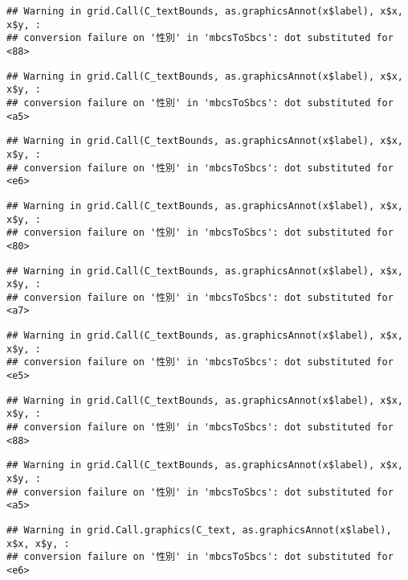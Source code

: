 \documentclass[
]{book}
\begin{document}
\begin{verbatim}
## Warning in grid.Call(C_textBounds, as.graphicsAnnot(x$label), x$x, x$y, :
## conversion failure on '性別' in 'mbcsToSbcs': dot substituted for <88>
\end{verbatim}

\begin{verbatim}
## Warning in grid.Call(C_textBounds, as.graphicsAnnot(x$label), x$x, x$y, :
## conversion failure on '性別' in 'mbcsToSbcs': dot substituted for <a5>
\end{verbatim}

\begin{verbatim}
## Warning in grid.Call(C_textBounds, as.graphicsAnnot(x$label), x$x, x$y, :
## conversion failure on '性別' in 'mbcsToSbcs': dot substituted for <e6>
\end{verbatim}

\begin{verbatim}
## Warning in grid.Call(C_textBounds, as.graphicsAnnot(x$label), x$x, x$y, :
## conversion failure on '性別' in 'mbcsToSbcs': dot substituted for <80>
\end{verbatim}

\begin{verbatim}
## Warning in grid.Call(C_textBounds, as.graphicsAnnot(x$label), x$x, x$y, :
## conversion failure on '性別' in 'mbcsToSbcs': dot substituted for <a7>
\end{verbatim}

\begin{verbatim}
## Warning in grid.Call(C_textBounds, as.graphicsAnnot(x$label), x$x, x$y, :
## conversion failure on '性別' in 'mbcsToSbcs': dot substituted for <e5>
\end{verbatim}

\begin{verbatim}
## Warning in grid.Call(C_textBounds, as.graphicsAnnot(x$label), x$x, x$y, :
## conversion failure on '性別' in 'mbcsToSbcs': dot substituted for <88>
\end{verbatim}

\begin{verbatim}
## Warning in grid.Call(C_textBounds, as.graphicsAnnot(x$label), x$x, x$y, :
## conversion failure on '性別' in 'mbcsToSbcs': dot substituted for <a5>
\end{verbatim}

\begin{verbatim}
## Warning in grid.Call.graphics(C_text, as.graphicsAnnot(x$label), x$x, x$y, :
## conversion failure on '性別' in 'mbcsToSbcs': dot substituted for <e6>
\end{verbatim}
\end{document}
